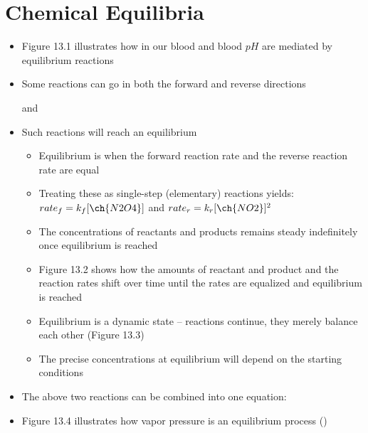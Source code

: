 \documentclass[12pt, openany, letterpaper]{memoir}
\begin{document}
\section{Chemical Equilibria}
\begin{itemize}
  \item Figure 13.1 illustrates how  in our blood and blood $pH$ are mediated by equilibrium reactions
  \item Some reactions can go in both the forward and reverse directions
	
	 and 
	\item Such reactions will reach an equilibrium
	\begin{itemize}
		\item Equilibrium is when the forward reaction rate and the reverse reaction rate are equal
    \item Treating these as single-step (elementary) reactions yields: $rate_f=k_f[\ch{N2O4}]$ and $rate_r=k_r[\ch{NO2}]^2$
		\item The concentrations of reactants and products remains steady indefinitely once equilibrium is reached
		\item Figure 13.2 shows how the amounts of reactant and product and the reaction rates shift over time until the rates are equalized and equilibrium is reached
		\item Equilibrium is a dynamic state -- reactions continue, they merely balance each other (Figure 13.3)
		\item The precise concentrations at equilibrium will depend on the starting conditions
	\end{itemize}
	\item The above two reactions can be combined into one equation: 
  \item Figure 13.4 illustrates how vapor pressure is an equilibrium process ()
\end{itemize}
\end{document}
